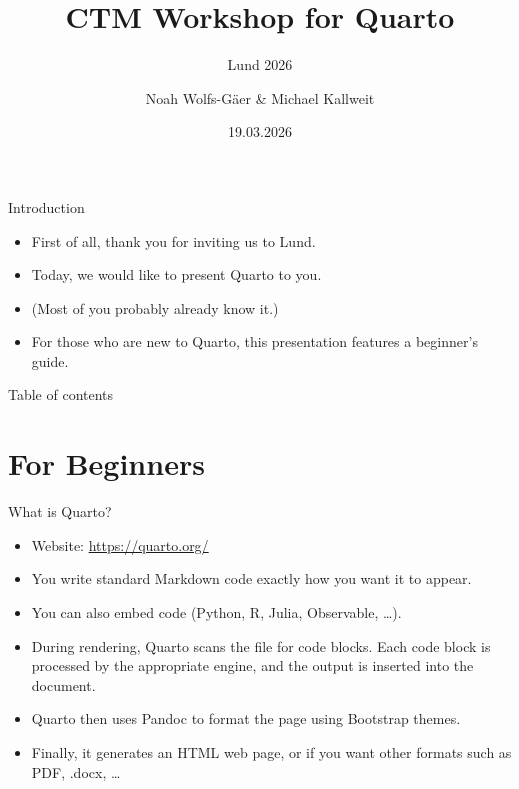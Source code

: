 \documentclass[aspectratio=169, t]{beamer}
\title{CTM Workshop for Quarto}
\subtitle{Lund 2026}
\author{Noah Wolfs-Gäer \& Michael Kallweit}
\institute{Ruhr University Bochum}
\date{19.03.2026}
\begin{document}
\maketitle

\begin{frame}{Introduction}
    \begin{itemize}
        \item First of all, thank you for inviting us to Lund.
        \item Today, we would like to present Quarto to you.
        \item (Most of you probably already know it.)
        \item For those who are new to Quarto, this presentation features a beginner's guide.
    \end{itemize}
\end{frame}

\begin{frame}{Table of contents}
    \tableofcontents
\end{frame}

\section{For Beginners}

\begin{frame}{What is Quarto?}
    \begin{itemize}
        \item Website: \url{https://quarto.org/}
        \item You write standard Markdown code exactly how you want it to appear.
        \item You can also embed code (Python, R, Julia, Observable, \dots).
        \item During rendering, Quarto scans the file for code blocks. Each code block is processed by the appropriate engine, and the output is inserted into the document.
        \item Quarto then uses Pandoc to format the page using Bootstrap themes.
        \item Finally, it generates an HTML web page, or if you want other formats such as PDF, .docx, \dots
    \end{itemize}
\end{frame}
\end{document}
